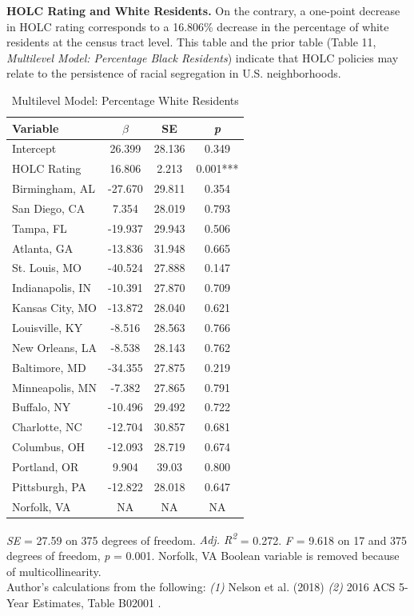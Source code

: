 \documentclass[paper=letter, fontsize=12pt]{scrartcl} %
\begin{document}
	\begin{table}
		\textbf{HOLC Rating and White Residents.} On the contrary, a one-point decrease in HOLC rating corresponds to a 16.806\% decrease in the percentage of white residents at the census tract level. This table and the prior table (Table 11, \textit{Multilevel Model: Percentage Black Residents}) indicate that HOLC policies may relate to the persistence of racial segregation in U.S. neighborhoods.
		\caption{Multilevel Model: Percentage White Residents}
		\begin{center}
			\begin{tabular}{|| l | c c c ||}
				\hline
				Variable & $\beta$ & SE & \textit{p}\\
				\hline \hline
				Intercept & 26.399 & 28.136 & 0.349\\ 
				\hline 
				HOLC Rating & 16.806 & 2.213 & 0.001***\\ 
				\hline 
				Birmingham, AL & -27.670 & 29.811 & 0.354\\ 
				\hline 
				San Diego, CA & 7.354 & 28.019 & 0.793\\ 
				\hline 
				Tampa, FL & -19.937 & 29.943 & 0.506\\ 
				\hline 
				Atlanta, GA & -13.836 & 31.948 & 0.665\\ 
				\hline 
				St. Louis, MO & -40.524 & 27.888 & 0.147\\ 
				\hline 
				Indianapolis, IN & -10.391 & 27.870 & 0.709\\ 
				\hline 
				Kansas City, MO & -13.872 & 28.040 & 0.621\\ 
				\hline 
				Louisville, KY & -8.516 & 28.563 & 0.766\\ 
				\hline 
				New Orleans, LA & -8.538 & 28.143 & 0.762\\ 
				\hline 
				Baltimore, MD & -34.355 & 27.875 & 0.219\\ 
				\hline 
				Minneapolis, MN & -7.382 & 27.865 & 0.791\\ 
				\hline 
				Buffalo, NY & -10.496 & 29.492 & 0.722\\ 
				\hline 
				Charlotte, NC & -12.704 & 30.857 & 0.681\\ 
				\hline 
				Columbus, OH & -12.093 & 28.719 & 0.674\\ 
				\hline 
				Portland, OR & 9.904 & 39.03 & 0.800\\ 
				\hline 
				Pittsburgh, PA & -12.822 & 28.018 & 0.647\\ 
				\hline 
				Norfolk, VA & NA & NA & NA\\  
				\hline
			\end{tabular}
		\end{center}
		\textit{SE} = 27.59 on 375 degrees of freedom. \textit{Adj. R\textsuperscript{2}} = 0.272. \textit{F} = 9.618 on 17 and 375 degrees of freedom, \textit{p} = 0.001. Norfolk, VA Boolean variable is removed because of multicollinearity.\\
		Author's calculations from the following: \textit{(1)} Nelson et al. (2018) \cite{richmond} \textit{(2)} 2016 ACS 5-Year Estimates, Table B02001 \cite{acs16}.
	\end{table}
	
\end{document}
